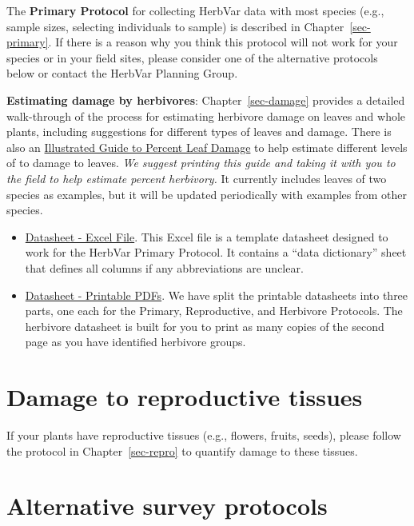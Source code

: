 \documentclass[
  letterpaper,
  DIV=11,
  numbers=noendperiod]{scrreprt}
\begin{document}
The \textbf{Primary Protocol} for collecting HerbVar data with most
species (e.g., sample sizes, selecting individuals to sample) is
described in Chapter~\ref{sec-primary}. If there is a reason why you
think this protocol will not work for your species or in your field
sites, please consider one of the alternative protocols below or contact
the HerbVar Planning Group.

\textbf{Estimating damage by herbivores}: Chapter~\ref{sec-damage}
provides a detailed walk-through of the process for estimating herbivore
damage on leaves and whole plants, including suggestions for different
types of leaves and damage. There is also an
\href{./protocols/Illustrated\%20Guide\%20to\%20Percent\%20Leaf\%20Damage.pdf}{Illustrated
Guide to Percent Leaf Damage} to help estimate different levels of to
damage to leaves. \emph{We suggest printing this guide and taking it
with you to the field to help estimate percent herbivory.} It currently
includes leaves of two species as examples, but it will be updated
periodically with examples from other species.

\begin{itemize}
\item
  \href{protocols/HerbVar_Datasheet_Template.xlsx}{Datasheet - Excel
  File}. This Excel file is a template datasheet designed to work for
  the HerbVar Primary Protocol. It contains a ``data dictionary'' sheet
  that defines all columns if any abbreviations are unclear.
\item
  \href{https://drive.google.com/drive/folders/10-9xPm9yOAvGCtL3dmVaoz7ODI1fghYG?usp=sharing}{Datasheet
  - Printable PDFs}. We have split the printable datasheets into three
  parts, one each for the Primary, Reproductive, and Herbivore
  Protocols. The herbivore datasheet is built for you to print as many
  copies of the second page as you have identified herbivore groups.
\end{itemize}

\section{Damage to reproductive
tissues}\label{damage-to-reproductive-tissues}

If your plants have reproductive tissues (e.g., flowers, fruits, seeds),
please follow the protocol in Chapter~\ref{sec-repro} to quantify damage
to these tissues.

\section{Alternative survey
protocols}\label{alternative-survey-protocols}
\end{document}

